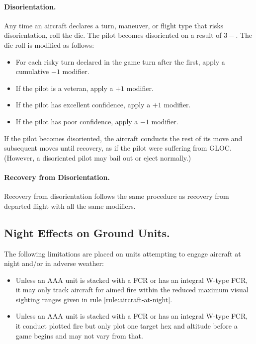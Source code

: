 \begin{advancedrules}
{\paragraph{Disorientation.} Any time an aircraft declares a turn, maneuver, or flight type that risks disorientation, roll the die. The pilot becomes disoriented on a result of $3-$. The die roll is modified as follows:
\begin{itemize}
    \item For each risky turn declared in the game turn after the first, apply a cumulative $-1$ modifier.
    \item If the pilot is a veteran, apply a $+1$ modifier.
    \item If the pilot has excellent confidence, apply a $+1$ modifier.
    \item If the pilot has poor confidence, apply a $-1$ modifier.
\end{itemize}

If the pilot becomes disoriented, the aircraft conducts the rest of its move and subsequent moves until recovery, as if the pilot were suffering from GLOC. (However, a disoriented pilot may bail out or eject normally.)

\paragraph{Recovery from Disorientation.} Recovery from disorientation follows the same procedure as recovery from departed flight with all the same modifiers.

\subsection{Night Effects on Ground Units.} The following limitations are placed on units attempting to engage aircraft at night and/or in adverse weather:

\begin{itemize}

    \item Unless an AAA unit is stacked with a FCR or has an integral W-type FCR, it may only track aircraft for aimed fire within the reduced maximum visual sighting ranges given in rule \ref{rule:aircraft-at-night}. 

    \item Unless an AAA unit is stacked with a FCR or has an integral W-type FCR, it conduct plotted fire but only plot one target hex and altitude before a game begins and may not vary from that.


\end{itemize}}
\end{advancedrules}
